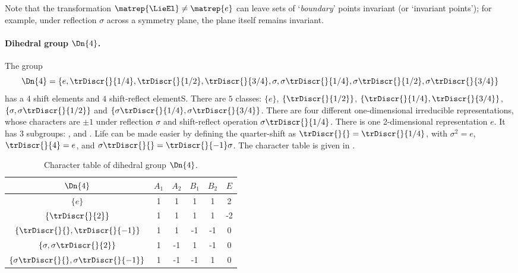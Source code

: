 Note that the {\statesp} transformation $\matrep{\LieEl} \neq \matrep{e}$
can leave sets of `{\em boundary}' points  invariant (or `invariant
points'); for example, under reflection
$\sigma$ across a symmetry plane, the plane itself remains invariant.

\paragraph{Dihedral group $\Dn{4}$.}
\label{exam:D4chars}
The   group
\[\Dn{4}=\{e,\trDiscr{}{1/4},\trDiscr{}{1/2},\trDiscr{}{3/4},
           \sigma,\sigma\trDiscr{}{1/4},
           \sigma\trDiscr{}{1/2},\sigma\trDiscr{}{3/4} \}
\]
has a
$4$ shift elements and $4$ shift-reflect elementS.
There are $5$ classes:
$\{e\}$,
$\{\trDiscr{}{1/2}\}$,
$\{\trDiscr{}{1/4},\trDiscr{}{3/4}\}$,
$\{\sigma,\sigma\trDiscr{}{1/2}\}$ and
$\{\sigma\trDiscr{}{1/4},\sigma\trDiscr{}{3/4}\}$.
There are four different one-dimensional irreducible representations,
whose characters are $\pm 1$ under reflection $\sigma$ and shift-reflect
operation $\sigma\trDiscr{}{1/4}$.
There is one 2-dimensional representation $e$.
It has 3 subgroups:  ,   and  .
Life can be made easier by defining the quarter-shift as
$\trDiscr{}{} = \trDiscr{}{1/4}$,
with $\sigma^2=e$, $\trDiscr{}{4}=e$, and
$\sigma\trDiscr{}{}=\trDiscr{}{-1}\sigma$.
The character table is given in .

\begin{table}
\begin{center}
\begin{tabular}{c|ccccc}
$\Dn{4}$       & $A_1$& $A_2$& $B_1$& $B_2$& $E$ \\
\hline
$\{e\}$        &   1  &   1  &  1   &  1  &  2  \\
$\{\trDiscr{}{2}\}$
               &   1  &   1  &  1   &  1  & -2 \\
$\{\trDiscr{}{},\trDiscr{}{-1}\}$
               &   1  &   1  & -1   & -1  &  0  \\
$\{\sigma,\sigma\trDiscr{}{2}\}$
               &   1  &  -1  &  1   & -1  &  0  \\
$\{\sigma\trDiscr{}{},\sigma\trDiscr{}{-1}\}$
               &   1  &  -1  &  -1  & 1   &  0
\end{tabular}
\end{center}
  \caption{\label{tab:D4char}
Character table of dihedral group $\Dn{4}$.
  }
\end{table}


